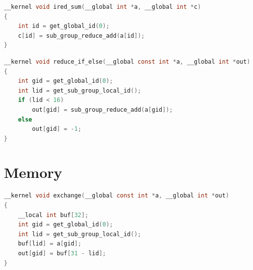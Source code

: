 \begin{lstlisting}[language=C, caption={[Source of ired\_sum]OpenCL source of \texttt{ired\_sum}.}, label={lst:app-ired-sum}]
__kernel void ired_sum(__global int *a, __global int *c)
{
    int id = get_global_id(0);
    c[id] = sub_group_reduce_add(a[id]);
}
\end{lstlisting}

\begin{lstlisting}[language=C, caption={[Source of reduce\_if\_else]OpenCL source of \texttt{reduce\_if\_else}.}, label={lst:app-reduce-if-else}]
__kernel void reduce_if_else(__global const int *a, __global int *out)
{
    int gid = get_global_id(0);
    int lid = get_sub_group_local_id();
    if (lid < 16)
        out[gid] = sub_group_reduce_add(a[gid]);
    else
        out[gid] = -1;
}
\end{lstlisting}

\section*{Memory}

\begin{lstlisting}[language=C, caption={[Source of exchange]OpenCL source of \texttt{exchange}.}, label={lst:app-exchange}]
__kernel void exchange(__global const int *a, __global int *out)
{
    __local int buf[32];
    int gid = get_global_id(0);
    int lid = get_sub_group_local_id();
    buf[lid] = a[gid];
    out[gid] = buf[31 - lid];
}
\end{lstlisting}
